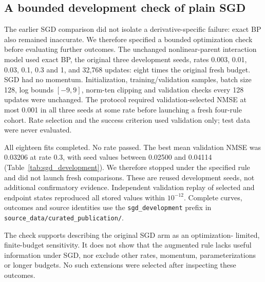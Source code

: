 \subsection{A bounded development check of plain SGD}
\label{sec:sgd_development}

The earlier SGD comparison did not isolate a derivative-specific failure:
exact BP also remained inaccurate. We therefore specified a bounded
optimization check before evaluating further outcomes. The unchanged
nonlinear-parent interaction model used exact BP, the original three
development seeds, rates 0.003, 0.01, 0.03, 0.1, 0.3 and 1, and 32,768
updates: eight times the original fresh budget. SGD had no momentum.
Initialization, training/validation samples, batch size 128, log bounds
$[-9,9]$, norm-ten clipping and validation checks every 128 updates were
unchanged. The protocol required validation-selected NMSE at most 0.001
in all three seeds at some rate before launching a fresh four-rule cohort.
Rate selection and the success criterion used validation only; test data
were never evaluated.

All eighteen fits completed. No rate passed. The best mean validation NMSE
was 0.03206 at rate 0.3, with seed values between 0.02500 and 0.04114
(Table~\ref{tab:sgd_development}). We therefore stopped under the specified
rule and did not launch fresh comparisons. These are reused development
seeds, not additional confirmatory evidence. Independent validation replay
of selected and endpoint states reproduced all stored values within
$10^{-12}$. Complete curves, outcomes and source identities use the
\texttt{sgd\_development} prefix in
\texttt{source\_data/curated\_publication/}.

The check supports describing the original SGD arm as an optimization-
limited, finite-budget sensitivity. It does not show that the augmented
rule lacks useful information under SGD, nor exclude other rates,
momentum, parameterizations or longer budgets. No such extensions were
selected after inspecting these outcomes.
